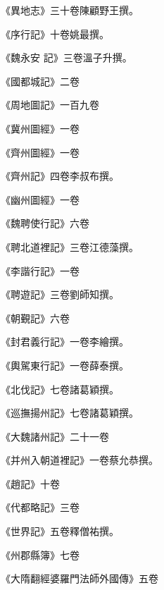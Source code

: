 \begin{pinyinscope}
 《異地志》三十卷陳顧野王撰。



 《序行記》十卷姚最撰。



 《魏永安
 記》三卷溫子升撰。



 《國都城記》二卷



 《周地圖記》一百九卷



 《冀州圖經》一卷



 《齊州圖經》一卷



 《齊州記》四卷李叔布撰。



 《幽州圖經》一卷



 《魏聘使行記》六卷



 《聘北道裡記》三卷江德藻撰。



 《李諧行記》一卷



 《聘遊記》三卷劉師知撰。



 《朝覲記》六卷



 《封君義行記》一卷李繪撰。



 《輿駕東行記》一卷薛泰撰。



 《北伐記》七卷諸葛穎撰。



 《巡撫揚州記》七卷諸葛穎撰。



 《大魏諸州記》二十一卷



 《并州入朝道裡記》一卷蔡允恭撰。



 《趙記》十卷



 《代都略記》三卷



 《世界記》五卷釋僧祐撰。



 《州郡縣簿》七卷



 《大隋翻經婆羅門法師外國傳》五卷




\end{pinyinscope}
